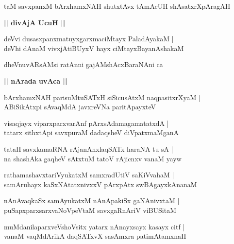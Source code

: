 \documentclass[twoside,12pt,openright]{book}
\newcounter{shloka}[chapter]
\def\uvaca#1{\centerline{{\large\textbf{#1}}}}
\begin{document}
\begin{shloka}%
taM savxpanxM bArxhamxNAH shutxtAvx tAmAcUH shAsatxrXpAragAH 
\end{shloka}

\uvaca{|| divAjA UcuH ||}

\begin{shloka}%
deVvi dusasxpanxmatuyxgarxmaciMtayx PaladAyakaM |\\
deVhi dAnaM vivxjAtiBUyxV hayx ciMtayxBayanAshakaM 
\end{shloka}

\begin{shloka}%
dheVnuvARsAMsi ratAnni gajAMshAcxBaraNAni ca 
\end{shloka}

\uvaca{|| nArada uvAca ||}

\begin{shloka}%
bArxhamxNAH parisuMtuSATxH siSicusAtxM naqpasitxrXyaM |\\
ABiSikAtxpi sAvaqMdA javxreVNa paritApayxteV 
\end{shloka}

\begin{shloka}%
visaqjayx viparxparxvarAnf pArxsAdamagamatatxdA |\\
tatarx sithxtApi savxpuraM dadaqsheV diVpatxmaMganA 
\end{shloka}

\begin{shloka}%
tataH savxkamaRNA rAjanAnxlaqSATx haraNA tu sA |\\
na shashAka gaqheV sAtxtuM tatoV rAjicnxv vanaM yayw
\end{shloka}

\begin{shloka}%
rathamashavxtariVyukatxM samxradUtiV saKiVvahaM |\\
samAruhayx kaSxNAtatxnivxxV pArxpAtx swBAgayxkAnanaM 
\end{shloka}

\begin{shloka}%
nAnAvaqkaSx samAyukatxM nAnApakiSx gaNAnivxtaM |\\
puSapxparxsarxvaNoVpeVtaM savxgaRnAriV viBUSitaM 
\end{shloka}

\begin{shloka}%
muMdanilaparxveVshoVsitx yatarx nAnayxsayx kasayx citf |\\
vanaM vaqMdArikA daqSATxvX sasAmxra patimAtamxnaH 
\end{shloka}
\end{document}
